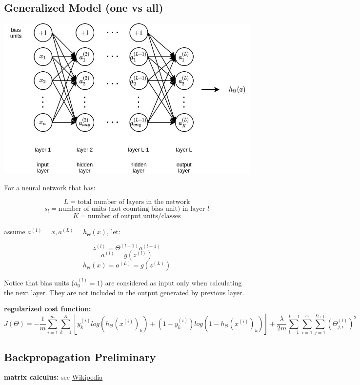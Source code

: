 \documentclass{article}
\begin{document}
\subsection{Generalized Model (one vs all)}

\begin{center}
\includegraphics[scale=0.4]{./images/neural_network_generalized.jpg}
\end{center}

\noindent For a neural network that has:

\[L = \text{total number of layers in the network}\]
\[s_l = \text{number of units (not counting bias unit) in layer } l\]
\[K = \text{number of output units/classes}\]

\noindent assume \(a^{(1)} = x, a^{(L)} = h_\Theta(x)\), let:

\[z^{(l)} = \Theta^{(l - 1)} a^{(l - 1)}\]
\[a^{(l)} = g(z^{(l)})\]
\[h_\Theta(x) = a^{(L)} = g(z^{(L)})\]

\noindent Notice that bias units (\(a_0^{(l)} = 1\)) are considered as input only when calculating the next layer. They are not included in the output generated by previous layer.

\bigskip

\noindent \textbf{regularized cost function:}
\[J(\Theta) = - \frac{1}{m} \sum_{i = 1}^{m} \sum_{k = 1}^{K} [y^{(i)}_k log(h_{\Theta} (x^{(i)})_k) + (1 - y^{(i)}_k) log(1 - h_{\Theta}(x^{(i)})_k)] + \frac{\lambda}{2m} \sum_{l = 1}^{L - 1} \sum_{i = 1}^{s_l} \sum_{j = 1}^{s_{l + 1}} (\Theta_{j, i}^{(l)})^{2}\]

\subsection{Backpropagation Preliminary}
\noindent \textbf{matrix calculus:} see \href{https://en.wikipedia.org/wiki/Matrix_calculus}{Wikipedia}
\end{document}
